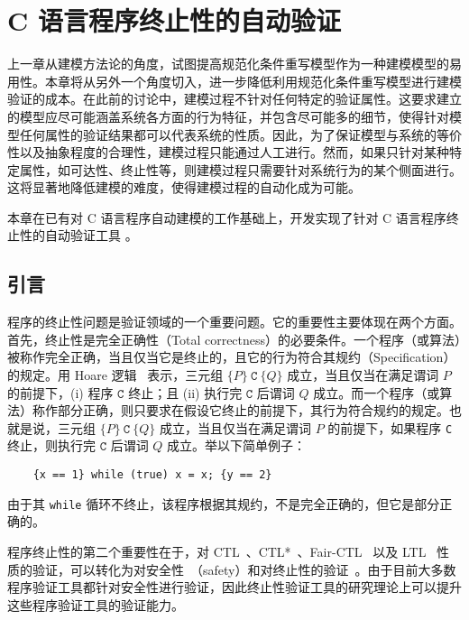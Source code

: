 \chapter{C 语言程序终止性的自动验证}
\label{cha:c-termination}

上一章从建模方法论的角度，试图提高规范化条件重写模型作为一种建模模型的易用性。本章将从另外一个角度切入，进一步降低利用规范化条件重写模型进行建模验证的成本。在此前的讨论中，建模过程不针对任何特定的验证属性。这要求建立的模型应尽可能涵盖系统各方面的行为特征，并包含尽可能多的细节，使得针对模型任何属性的验证结果都可以代表系统的性质。因此，为了保证模型与系统的等价性以及抽象程度的合理性，建模过程只能通过人工进行。然而，如果只针对某种特定属性，如可达性、终止性等，则建模过程只需要针对系统行为的某个侧面进行。这将显著地降低建模的难度，使得建模过程的自动化成为可能。

本章在已有对 C 语言程序自动建模的工作基础上，开发实现了针对 C 语言程序终止性的自动验证工具 \CTerm。

\section{引言}

程序的终止性问题是验证领域的一个重要问题。它的重要性主要体现在两个方面。首先，终止性是完全正确性（Total correctness）的必要条件。一个程序（或算法）被称作完全正确，当且仅当它是终止的，且它的行为符合其规约（Specification）的规定。用 Hoare 逻辑~\cite{DBLP:journals/cacm/Hoare69} 表示，三元组 $\{P\}~\texttt{C}~\{Q\}$ 成立，当且仅当在满足谓词 $P$ 的前提下，(i) 程序 $\texttt{C}$ 终止；且 (ii) 执行完 $\texttt{C}$ 后谓词 $Q$ 成立。而一个程序（或算法）称作部分正确，则只要求在假设它终止的前提下，其行为符合规约的规定。也就是说，三元组 $\{P\}~\texttt{C}~\{Q\}$ 成立，当且仅当在满足谓词 $P$ 的前提下，如果程序 \verb|C| 终止，则执行完 $\texttt{C}$ 后谓词 $Q$ 成立。举以下简单例子：
\begin{verbatim}
    {x == 1} while (true) x = x; {y == 2}
\end{verbatim}
由于其 \verb|while| 循环不终止，该程序根据其规约，不是完全正确的，但它是部分正确的。

程序终止性的第二个重要性在于，对 CTL~\cite{DBLP:conf/lop/ClarkeE81}、CTL*~\cite{DBLP:journals/jacm/EmersonH86}、Fair-CTL~\cite{DBLP:journals/jcss/EmersonH85} 以及 LTL~\cite{DBLP:conf/banff/Vardi95} 性质的验证，可以转化为对安全性~\cite{DBLP:journals/tse/Lamport77}（safety）和对终止性的验证~\cite{DBLP:conf/tacas/BrockschmidtCIK16}。由于目前大多数程序验证工具都针对安全性进行验证，因此终止性验证工具的研究理论上可以提升这些程序验证工具的验证能力。

